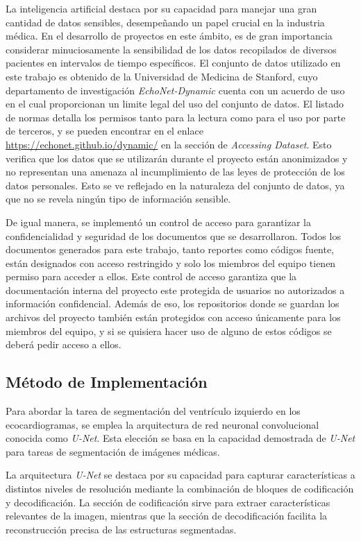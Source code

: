 \documentclass[runningheads]{llncs}
\begin{document}
La inteligencia artificial destaca por su capacidad para manejar una gran cantidad de datos sensibles, desempeñando un papel crucial en la industria médica. En el desarrollo de proyectos en este ámbito, es de gran importancia considerar minuciosamente la sensibilidad de los datos recopilados de diversos pacientes en intervalos de tiempo específicos. El conjunto de datos utilizado en este trabajo es obtenido de la Universidad de Medicina de Stanford, cuyo departamento de investigación \textit{EchoNet-Dynamic} cuenta con un acuerdo de uso en el cual proporcionan un limite legal del uso del conjunto de datos. El listado de normas detalla los permisos tanto para la lectura como para el uso por parte de terceros, y se pueden encontrar en el enlace \url{https://echonet.github.io/dynamic/} en la sección de \textit{Accessing Dataset}. Esto verifica que los datos que se utilizarán durante el proyecto están anonimizados y no representan una amenaza al incumplimiento de las leyes de protección de los datos personales. Esto se ve reflejado en la naturaleza del conjunto de datos, ya que no se revela ningún tipo de información sensible.

De igual manera, se implementó un control de acceso para garantizar la confidencialidad y seguridad de los documentos que se desarrollaron. Todos los documentos generados para este trabajo, tanto reportes como códigos fuente, están designados con acceso restringido y solo los miembros del equipo tienen permiso para acceder a ellos. Este control de acceso garantiza que la documentación interna del proyecto este protegida de usuarios no autorizados a información confidencial. Además de eso, los repositorios donde se guardan los archivos del proyecto también están protegidos con acceso únicamente para los miembros del equipo, y si se quisiera hacer uso de alguno de estos códigos se deberá pedir acceso a ellos.

\subsection{Método de Implementación}
Para abordar la tarea de segmentación del ventrículo izquierdo en los ecocardiogramas, se emplea la arquitectura de red neuronal convolucional conocida como \textit{U-Net}. Esta elección se basa en la capacidad demostrada de \textit{U-Net} para tareas de segmentación de imágenes médicas.

La arquitectura \textit{U-Net} se destaca por su capacidad para capturar características a distintos niveles de resolución mediante la combinación de bloques de codificación y decodificación. La sección de codificación sirve para extraer características relevantes de la imagen, mientras que la sección de decodificación facilita la reconstrucción precisa de las estructuras segmentadas.
\end{document}
